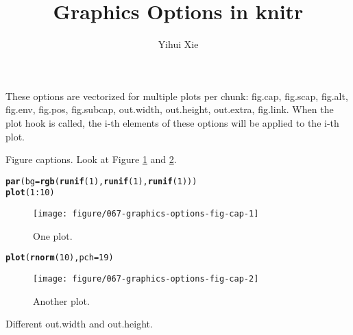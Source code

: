 \documentclass{article}\usepackage[]{graphicx}\usepackage[]{xcolor}
\title{Graphics Options in knitr}
\author{Yihui Xie}
\makeatletter
\newcommand{\hlnum}[1]{\textcolor[rgb]{0.686,0.059,0.569}{#1}}%
\newcommand{\hlopt}[1]{\textcolor[rgb]{0,0,0}{#1}}%
\newcommand{\hldef}[1]{\textcolor[rgb]{0.345,0.345,0.345}{#1}}%
\newcommand{\hlkwc}[1]{\textcolor[rgb]{0.333,0.667,0.333}{#1}}%
\newcommand{\hlkwd}[1]{\textcolor[rgb]{0.737,0.353,0.396}{\textbf{#1}}}%
\newenvironment{kframe}{%
 \def\at@end@of@kframe{}%
 \ifinner\ifhmode%
  \def\at@end@of@kframe{\end{minipage}}%
  \begin{minipage}{\columnwidth}%
 \fi\fi%
 \def\FrameCommand##1{\hskip\@totalleftmargin \hskip-\fboxsep
 \colorbox{shadecolor}{##1}\hskip-\fboxsep
     \hskip-\linewidth \hskip-\@totalleftmargin \hskip\columnwidth}%
 \MakeFramed {\advance\hsize-\width
   \@totalleftmargin\z@ \linewidth\hsize
   \@setminipage}}%
 {\par\unskip\endMakeFramed%
 \at@end@of@kframe}
\newenvironment{knitrout}{}{} %
\makeatother
\begin{document}
\maketitle



These options are vectorized for multiple plots per chunk: fig.cap, fig.scap, fig.alt, fig.env, fig.pos, fig.subcap, out.width, out.height, out.extra, fig.link.
When the plot hook is called, the i-th elements of these options will be
applied to the i-th plot.

Figure captions. Look at Figure \ref{fig:fig-cap-1} and \ref{fig:fig-cap-2}.

\begin{knitrout}
\color{fgcolor}\begin{kframe}
\begin{alltt}
\hlkwd{par}\hldef{(}\hlkwc{bg} \hldef{=} \hlkwd{rgb}\hldef{(}\hlkwd{runif}\hldef{(}\hlnum{1}\hldef{),} \hlkwd{runif}\hldef{(}\hlnum{1}\hldef{),} \hlkwd{runif}\hldef{(}\hlnum{1}\hldef{)))}
\hlkwd{plot}\hldef{(}\hlnum{1}\hlopt{:}\hlnum{10}\hldef{)}
\end{alltt}
\end{kframe}\begin{figure}[H]
\texttt{[image: figure/067-graphics-options-fig-cap-1]} \caption[One plot]{One plot.}\label{fig:fig-cap-1}
\end{figure}

\begin{kframe}\begin{alltt}
\hlkwd{plot}\hldef{(}\hlkwd{rnorm}\hldef{(}\hlnum{10}\hldef{),} \hlkwc{pch} \hldef{=} \hlnum{19}\hldef{)}
\end{alltt}
\end{kframe}\begin{figure}[H]
\texttt{[image: figure/067-graphics-options-fig-cap-2]} \caption[Another plot]{Another plot.}\label{fig:fig-cap-2}
\end{figure}

\end{knitrout}

Different out.width and out.height.
\end{document}

